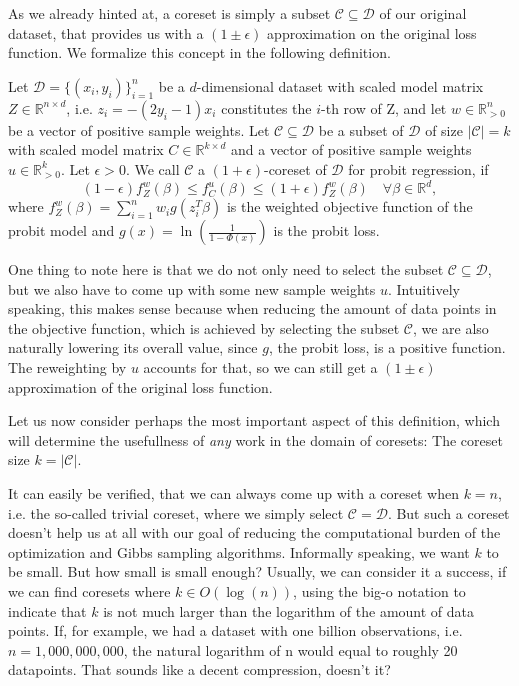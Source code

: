 As we already hinted at, a coreset is simply a subset
$\mathcal{C} \subseteq \mathcal{D}$ of our original dataset,
that provides us with a $(1 \pm \epsilon)$ approximation
on the original loss function.
We formalize this concept in the following definition.

\begin{definition}[Coreset]
    \label{def:coreset}
    Let $\mathcal{D}=\{(x_i, y_i)\}_{i=1}^n$ be a $d$-dimensional dataset
    with scaled model matrix $Z \in \mathbb{R}^{n \times d}$,
    i.e. $z_i = -(2y_i - 1)x_i$ constitutes the $i$-th
    row of Z, and let $w \in \mathbb{R}_{>0}^n$ be
    a vector of positive sample weights.
    Let $\mathcal{C} \subseteq \mathcal{D}$ be a subset of $\mathcal{D}$
    of size $|\mathcal{C}| = k$
    with scaled model matrix $C \in \mathbb{R}^{k \times d}$ and
    a vector of positive sample weights $u \in \mathbb{R}_{>0}^k$.
    Let $\epsilon > 0$.
    We call $\mathcal{C}$ a $(1+\epsilon)$-coreset of $\mathcal{D}$
    for probit regression, if
    \begin{equation*}
        (1-\epsilon)f_Z^w(\beta) \leq f_C^u(\beta) \leq (1+\epsilon)f_Z^w(\beta)
        \quad \forall \beta \in \mathbb{R}^d,
    \end{equation*}
    where $f_Z^w(\beta) = \sum_{i=1}^n w_i g(z_i^T \beta)$ is the
    weighted objective function of the probit model
    and $g(x) = \ln \left( \frac{1}{1 - \Phi(x)} \right)$ is the
    probit loss.
\end{definition}

One thing to note here is that we do not only need to select the
subset $\mathcal{C} \subseteq \mathcal{D}$, but we also have to come
up with some new sample weights $u$.
Intuitively speaking, this makes sense because when reducing the
amount of data points in the objective function, which is
achieved by selecting the subset $\mathcal{C}$, we are
also naturally lowering its overall value, since $g$, the
probit loss, is a positive function. The reweighting
by $u$ accounts for that, so we can still get a $(1 \pm \epsilon)$
approximation of the original loss function.

Let us now consider perhaps the most important aspect of this definition,
which will determine the usefullness of \textit{any} work in the
domain of coresets: The coreset size $k = |\mathcal{C}|$.

It can easily be verified, that we can always come up with a coreset
when $k = n$, i.e. the so-called trivial coreset, where
we simply select $\mathcal{C} = \mathcal{D}$.
But such a coreset doesn't help us at all with our goal of reducing the
computational burden of the optimization and Gibbs sampling algorithms.
Informally speaking, we want $k$ to be small. But how small
is small enough? Usually, we can consider it a success, if we
can find coresets where $k \in O(\log(n))$, using the big-o notation
to indicate that $k$ is not much larger than the logarithm
of the amount of data points. If, for example, we had
a dataset with one billion observations, i.e. $n = 1,000,000,000$,
the natural logarithm of n would equal to roughly 20 datapoints.
That sounds like a decent compression, doesn't it?


